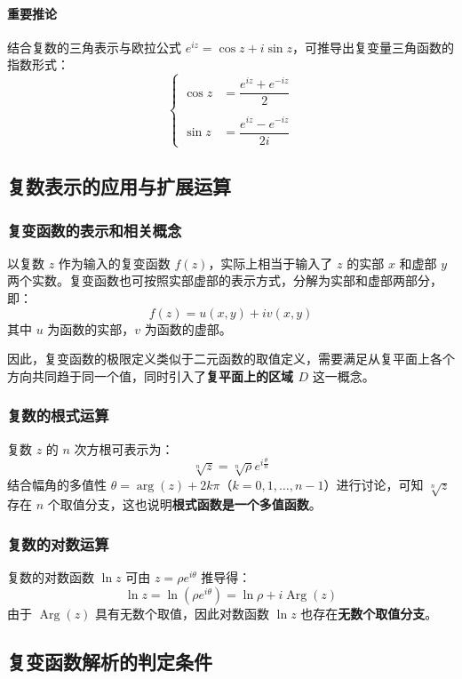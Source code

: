\documentclass{article}
\begin{document}
	\paragraph{重要推论}
	结合复数的三角表示与欧拉公式 $e^{iz}=\cos z+i\sin z$，可推导出复变量三角函数的指数形式：
	$$
	\left\{
	\begin{aligned}
		\cos z&=\dfrac{e^{iz}+e^{-iz}}{2} \\
		\\
		\sin z&=\dfrac{e^{iz}-e^{-iz}}{2i}
	\end{aligned}
	\right.
	$$
	
	
	
	\subsection{复数表示的应用与扩展运算}
	\subsubsection{复变函数的表示和相关概念}
	以复数 $z$ 作为输入的复变函数 $f(z)$，实际上相当于输入了 $z$ 的实部 $x$ 和虚部 $y$ 两个实数。复变函数也可按照实部虚部的表示方式，分解为实部和虚部两部分，即：
	\[
	f(z)=u(x,y)+iv(x,y)
	\]
	其中 $u$ 为函数的实部，$v$ 为函数的虚部。
	
	因此，复变函数的极限定义类似于二元函数的取值定义，需要满足从复平面上各个方向共同趋于同一个值，同时引入了\textbf{复平面上的区域 $D$} 这一概念。
	
	\subsubsection{复数的根式运算}
	复数 $z$ 的 $n$ 次方根可表示为：
	\[
	\sqrt[n]{z}=\sqrt[n]{\rho}e^{i\frac{\theta}{n}}
	\]
	结合幅角的多值性 $\theta=\arg(z)+2k\pi$（$k=0,1,\dots,n-1$）进行讨论，可知 $\sqrt[n]{z}$ 存在 $n$ 个取值分支，这也说明\textbf{根式函数是一个多值函数}。
	
	\subsubsection{复数的对数运算}
	复数的对数函数 $\ln z$ 可由 $z=\rho e^{i\theta}$ 推导得：
	\[
	\ln z=\ln(\rho e^{i\theta})=\ln\rho+i\operatorname{Arg}(z)
	\]
	由于 $\operatorname{Arg}(z)$ 具有无数个取值，因此对数函数 $\ln z$ 也存在\textbf{无数个取值分支}。
	
	
	
	\subsection{复变函数解析的判定条件}
\end{document}

